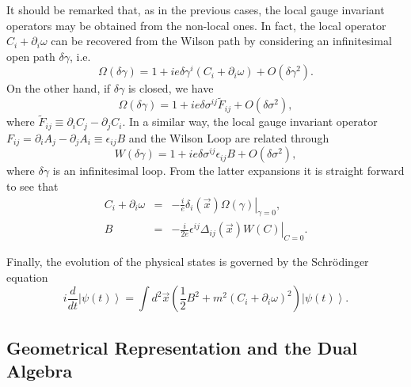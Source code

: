 \documentclass[a4paper,12pt]{article}
\newcommand{\ket}[1]{\left|#1\right\rangle}
\begin{document}
It should be remarked that, as in the previous cases, the local
gauge invariant operators may be obtained from the non-local ones.
In fact, the local operator $C_i+\partial_i\omega$ can be
recovered from the Wilson path by considering an infinitesimal
open path $\delta\gamma$, i.e.
\begin{equation}
\Omega(\delta\gamma)=1+ie\delta\gamma^i\left(C_i+\partial_i\omega\right)+
O(\delta\gamma^2).\label{C-O}
\end{equation}
On the other hand, if $\delta\gamma$ is closed, we have
\begin{equation}
\Omega(\delta\gamma)=1+ie\delta\sigma^{ij}\tilde F_{ij}+O(\delta\sigma^2),
\end{equation}
where $\tilde F_{ij}\equiv\partial_iC_j-\partial_jC_i$. In a similar way,
the local gauge invariant operator $F_{ij}=\partial_iA_j-\partial_jA_i\equiv\epsilon_{ij}B$
and the Wilson Loop are related through
\begin{equation}
W(\delta\gamma)=1+ie\delta\sigma^{ij}\epsilon_{ij}B+O(\delta\sigma^2),\label{B-W}
\end{equation}
where $\delta\gamma$ is an infinitesimal loop. From the latter expansions it is
straight forward to see that
\begin{eqnarray}
C_i+\partial_i\omega&=&\left.-\frac{i}{e}\delta_i(\vec x)\Omega(\gamma)
\right|_{\gamma=0},\\
B&=&\left.-\frac{i}{2e}\epsilon^{ij}\Delta_{ij}(\vec x)W(C)
\right|_{C=0}.
\end{eqnarray}

Finally, the evolution of the physical states is governed by the Schr\"odinger equation
\begin{equation}
i\frac d{dt}\ket{\psi(t)}=\int d^2\vec x\left(\frac12B^2 +
m^2(C_i+\partial_i\omega)^2\right)\ket{\psi(t)}.
\end{equation}
\subsection{Geometrical Representation and the Dual Algebra}
\end{document}
